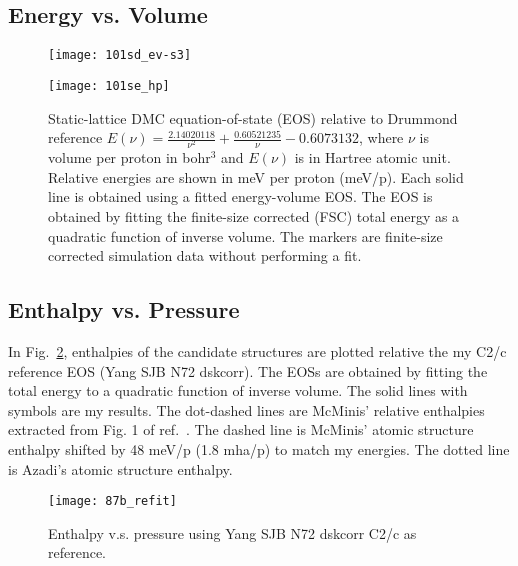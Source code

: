 \subsection{Energy vs. Volume}
\begin{figure}[h]
\begin{minipage}{0.48\textwidth}
\texttt{[image: 101sd\_ev-s3]}
\end{minipage}
\begin{minipage}{0.48\textwidth}
\texttt{[image: 101se\_hp]}
\end{minipage}
\caption{Static-lattice DMC equation-of-state (EOS) relative to Drummond reference $E(\nu) = \frac{2.14020118}{\nu^2} + \frac{0.60521235}{\nu} - 0.6073132$, where $\nu$ is volume per proton in bohr$^3$ and $E(\nu)$ is in Hartree atomic unit. Relative energies are shown in meV per proton (meV/p). Each solid line is obtained using a fitted energy-volume EOS. The EOS is obtained by fitting the finite-size corrected (FSC) total energy as a quadratic function of inverse volume. The markers are finite-size corrected simulation data without performing a fit. \label{fig:static-qmc-vs-drummond}}
\end{figure}

\subsection{Enthalpy vs. Pressure}
In Fig.~\ref{fig:static-enthalpy-vs-pressure}, enthalpies of the candidate structures are plotted relative the my C2/c reference EOS (Yang SJB N72 dskcorr). The EOSs are obtained by fitting the total energy to a quadratic function of inverse volume. The solid lines with symbols are my results. The dot-dashed lines are McMinis' relative enthalpies extracted from Fig. 1 of ref.~\cite{McMinis2015}. The dashed line is McMinis' atomic structure enthalpy shifted by 48 meV/p (1.8 mha/p) to match my energies. The dotted line is Azadi's atomic structure enthalpy.

\begin{figure}[h]
\texttt{[image: 87b\_refit]}
\caption{Enthalpy v.s. pressure using Yang SJB N72 dskcorr C2/c as reference.\label{fig:static-enthalpy-vs-pressure}}
\end{figure}
